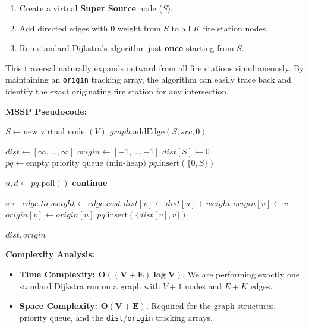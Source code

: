 \begin{enumerate}
    \item Create a virtual \textbf{Super Source} node ($S$).
    \item Add directed edges with $0$ weight from $S$ to all $K$ fire station nodes.
    \item Run standard Dijkstra's algorithm just \textbf{once} starting from $S$.
\end{enumerate}

This traversal naturally expands outward from all fire stations simultaneously. By maintaining an \texttt{origin} tracking array, the algorithm can easily trace back and identify the exact originating fire station for any intersection.

\textbf{MSSP Pseudocode:}
\begin{algorithm}[H]
\caption{MSSP - Super Source Dijkstra}
\begin{algorithmic}[1]
    \State $S \gets \text{new virtual node } (V)$
        \State $graph.\text{addEdge}(S, src, 0)$
    \EndFor
    
    \State $dist \gets [\infty, \dots, \infty]$
    \State $origin \gets [-1, \dots, -1]$ 
    \State $dist[S] \gets 0$
    \State $pq \gets \text{empty priority queue (min-heap)}$
    \State $pq.\text{insert}(\{0, S\})$
    
        \State $u, d \gets pq.\text{poll}()$
         \textbf{continue} \EndIf
        
            \State $v \gets edge.to$
            \State $weight \gets edge.cost$
                \State $dist[v] \gets dist[u] + weight$
                    \State $origin[v] \gets v$ 
                \Else
                    \State $origin[v] \gets origin[u]$ 
                \EndIf
                \State $pq.\text{insert}(\{dist[v], v\})$
            \EndIf
        \EndFor
    \EndWhile
    
    \State \Return $dist, origin$
\EndFunction
\end{algorithmic}
\end{algorithm}

\textbf{Complexity Analysis:}
\begin{itemize}
    \item \textbf{Time Complexity: $\mathbf{O((V + E) \log V)}$}. We are performing exactly one standard Dijkstra run on a graph with $V+1$ nodes and $E+K$ edges.
    \item \textbf{Space Complexity: $\mathbf{O(V + E)}$}. Required for the graph structures, priority queue, and the \texttt{dist}/\texttt{origin} tracking arrays.
\end{itemize}

